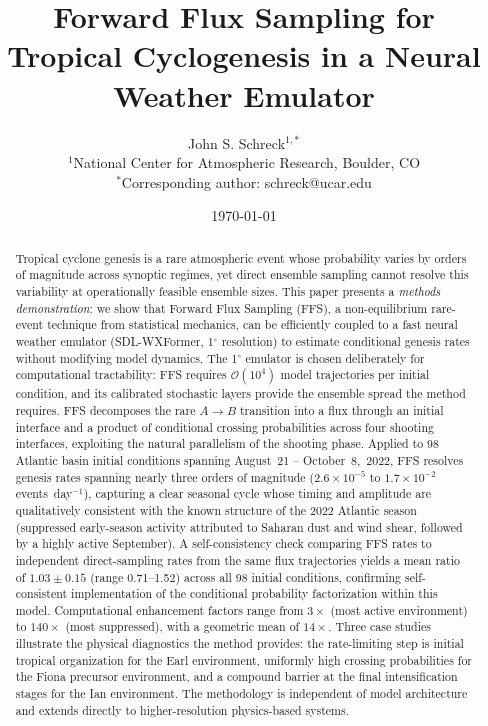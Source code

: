 \documentclass[11pt]{article}
\title{Forward Flux Sampling for Tropical Cyclogenesis in a Neural Weather Emulator}
\author{%
  John S. Schreck$^{1,*}$ \\
  \small $^1$National Center for Atmospheric Research, Boulder, CO \\
  \small $^*$Corresponding author: schreck@ucar.edu
}
\date{\today}
\begin{document}
\maketitle

\begin{abstract}
Tropical cyclone genesis is a rare atmospheric event whose probability varies by
orders of magnitude across synoptic regimes, yet direct ensemble sampling cannot resolve
this variability at operationally feasible ensemble sizes.
This paper presents a \textit{methods demonstration}: we show that Forward Flux Sampling
(FFS), a non-equilibrium rare-event technique from statistical mechanics, can be
efficiently coupled to a fast neural weather emulator (SDL-WXFormer, 1$^\circ$ resolution)
to estimate conditional genesis rates without modifying model dynamics.
The 1$^\circ$ emulator is chosen deliberately for computational tractability: FFS
requires $\mathcal{O}(10^4)$ model trajectories per initial condition, and its
calibrated stochastic layers provide the ensemble spread the method requires.
FFS decomposes the rare $A \to B$ transition into a flux through an initial interface
and a product of conditional crossing probabilities across four shooting interfaces,
exploiting the natural parallelism of the shooting phase.
Applied to 98 Atlantic basin initial conditions spanning August~21 -- October~8,~2022,
FFS resolves genesis rates spanning nearly three orders of magnitude
($2.6\times10^{-5}$ to $1.7\times10^{-2}$ events~day$^{-1}$),
capturing a clear seasonal cycle whose timing and amplitude are qualitatively consistent
with the known structure of the 2022 Atlantic season (suppressed early-season activity
attributed to Saharan dust and wind shear, followed by a highly active September).
A self-consistency check comparing FFS rates to independent direct-sampling rates from the
same flux trajectories yields a mean ratio of $1.03 \pm 0.15$ (range 0.71--1.52)
across all 98 initial conditions, confirming self-consistent implementation of the
conditional probability factorization within this model.
Computational enhancement factors range from $3\times$ (most active environment) to
$140\times$ (most suppressed), with a geometric mean of $14\times$.
Three case studies illustrate the physical diagnostics the method provides: the
rate-limiting step is initial tropical organization for the Earl environment, uniformly
high crossing probabilities for the Fiona precursor environment, and a compound barrier
at the final intensification stages for the Ian environment.
The methodology is independent of model architecture and extends directly to
higher-resolution physics-based systems.
\end{abstract}
\end{document}
